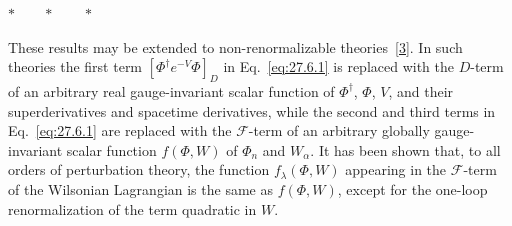 \begin{center}
\(\ast\qquad\ast\qquad\ast\)
\end{center}

These results may be extended to non-renormalizable
theories~\hyperref[ch27-ref-3]{[3]}. In such theories the first term
\([\Phi^\dagger e^{-V}\Phi]_D\) in Eq.~\eqref{eq:27.6.1} is replaced with
the \(D\)-term of an arbitrary real gauge-invariant scalar function of
\(\Phi^\dagger\), \(\Phi\), \(V\), and their superderivatives and spacetime
derivatives, while the second and third terms in Eq.~\eqref{eq:27.6.1} are
replaced with the \(\mathcal{F}\)-term of an arbitrary globally
gauge-invariant scalar function \(f(\Phi,W)\) of \(\Phi_n\) and \(W_\alpha\).
It has been shown that, to all orders of perturbation theory, the function
\(f_\lambda(\Phi,W)\) appearing in the \(\mathcal{F}\)-term of the
Wilsonian Lagrangian is the same as \(f(\Phi,W)\), except for the one-loop
renormalization of the term quadratic in \(W\).
